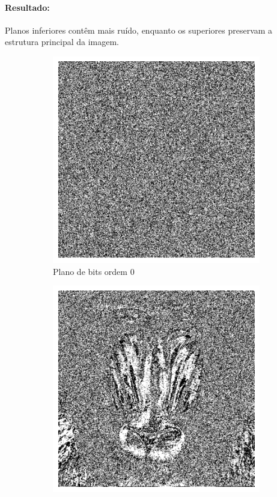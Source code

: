 \documentclass[12pt,a4paper]{report}
\begin{document}
\paragraph{Resultado:} 
Planos inferiores contêm mais ruído, enquanto os superiores preservam a estrutura principal da imagem.
\begin{figure}[H]
    \centering
    \begin{subfigure}[b]{0.32\textwidth}
        \includegraphics[width=\textwidth]{imagens/ex6-0.png}
        \caption{Plano de bits ordem 0}
    \end{subfigure}
    \hfill
    \begin{subfigure}[b]{0.32\textwidth}
        \includegraphics[width=\textwidth]{imagens/ex6-4.png}

\end{subfigure}
\end{figure}
\end{document}
